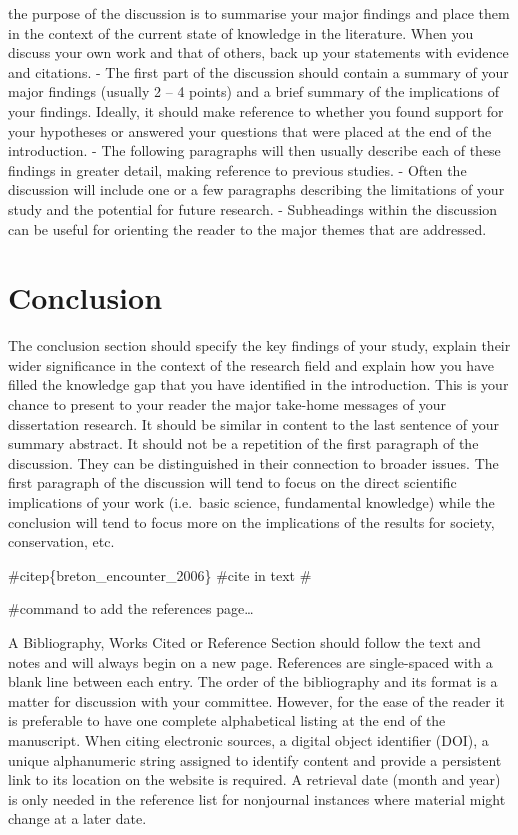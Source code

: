 \documentclass[
  11pt,
]{article}
\begin{document}
the purpose of the discussion is to summarise your major findings and
place them in the context of the current state of knowledge in the
literature. When you discuss your own work and that of others, back up
your statements with evidence and citations. - The first part of the
discussion should contain a summary of your major findings (usually 2 --
4 points) and a brief summary of the implications of your findings.
Ideally, it should make reference to whether you found support for your
hypotheses or answered your questions that were placed at the end of the
introduction. - The following paragraphs will then usually describe each
of these findings in greater detail, making reference to previous
studies. - Often the discussion will include one or a few paragraphs
describing the limitations of your study and the potential for future
research. - Subheadings within the discussion can be useful for
orienting the reader to the major themes that are addressed. \newpage

\hypertarget{conclusion}{%
\section{Conclusion}\label{conclusion}}

The conclusion section should specify the key findings of your study,
explain their wider significance in the context of the research field
and explain how you have filled the knowledge gap that you have
identified in the introduction. This is your chance to present to your
reader the major take-home messages of your dissertation research. It
should be similar in content to the last sentence of your summary
abstract. It should not be a repetition of the first paragraph of the
discussion. They can be distinguished in their connection to broader
issues. The first paragraph of the discussion will tend to focus on the
direct scientific implications of your work (i.e.~basic science,
fundamental knowledge) while the conclusion will tend to focus more on
the implications of the results for society, conservation, etc. \newpage

\#citep\{breton\_encounter\_2006\} \#cite in text \#



\#command to add the references page\ldots{}

A Bibliography, Works Cited or Reference Section should follow the text
and notes and will always begin on a new page. References are
single-spaced with a blank line between each entry. The order of the
bibliography and its format is a matter for discussion with your
committee. However, for the ease of the reader it is preferable to have
one complete alphabetical listing at the end of the manuscript. When
citing electronic sources, a digital object identifier (DOI), a unique
alphanumeric string assigned to identify content and provide a
persistent link to its location on the website is required. A retrieval
date (month and year) is only needed in the reference list for
nonjournal instances where material might change at a later date.
\newpage
\end{document}
